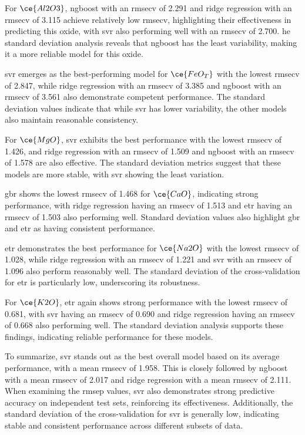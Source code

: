 For $\ce{Al2O3}$, \gls{ngboost} with an \gls{rmsecv} of 2.291 and ridge regression with an \gls{rmsecv} of 3.115 achieve relatively low \gls{rmsecv}, highlighting their effectiveness in predicting this oxide, with \gls{svr} also performing well with an \gls{rmsecv} of 2.700.
he standard deviation analysis reveals that \gls{ngboost} has the least variability, making it a more reliable model for this oxide.

\gls{svr} emerges as the best-performing model for $\ce{FeO_T}$ with the lowest \gls{rmsecv} of 2.847, while ridge regression with an \gls{rmsecv} of 3.385 and \gls{ngboost} with an \gls{rmsecv} of 3.561 also demonstrate competent performance.
The standard deviation values indicate that while \gls{svr} has lower variability, the other models also maintain reasonable consistency.

For $\ce{MgO}$, \gls{svr} exhibits the best performance with the lowest \gls{rmsecv} of 1.426, and ridge regression with an \gls{rmsecv} of 1.509 and \gls{ngboost} with an \gls{rmsecv} of 1.578 are also effective.
The standard deviation metrics suggest that these models are more stable, with \gls{svr} showing the least variation.

\gls{gbr} shows the lowest \gls{rmsecv} of 1.468 for $\ce{CaO}$, indicating strong performance, with ridge regression having an \gls{rmsecv} of 1.513 and \gls{etr} having an \gls{rmsecv} of 1.503 also performing well.
Standard deviation values also highlight \gls{gbr} and \gls{etr} as having consistent performance.

\gls{etr} demonstrates the best performance for $\ce{Na2O}$ with the lowest \gls{rmsecv} of 1.028, while ridge regression with an \gls{rmsecv} of 1.221 and \gls{svr} with an \gls{rmsecv} of 1.096 also perform reasonably well.
The standard deviation of the cross-validation for \gls{etr} is particularly low, underscoring its robustness.

For $\ce{K2O}$, \gls{etr} again shows strong performance with the lowest \gls{rmsecv} of 0.681, with \gls{svr} having an \gls{rmsecv} of 0.690 and ridge regression having an \gls{rmsecv} of 0.668 also performing well.
The standard deviation analysis supports these findings, indicating reliable performance for these models.

To summarize, \gls{svr} stands out as the best overall model based on its average performance, with a mean \gls{rmsecv} of 1.958. This is closely followed by \gls{ngboost} with a mean \gls{rmsecv} of 2.017 and ridge regression with a mean \gls{rmsecv} of 2.111.
When examining the \gls{rmsep} values, \gls{svr} also demonstrates strong predictive accuracy on independent test sets, reinforcing its effectiveness.
Additionally, the standard deviation of the cross-validation for \gls{svr} is generally low, indicating stable and consistent performance across different subsets of data.

